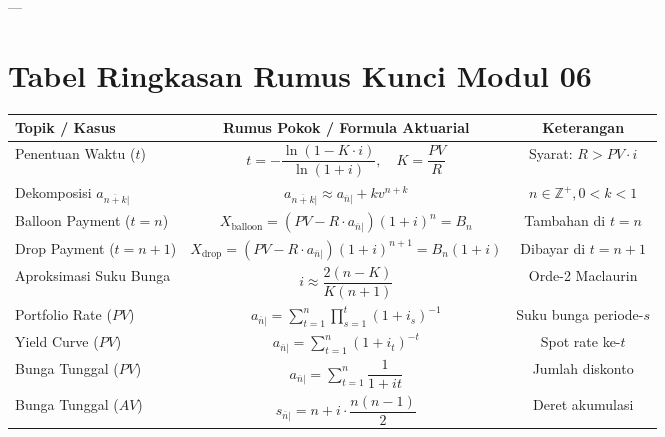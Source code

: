 \documentclass[11pt,a4paper]{article}
\begin{document}
---

\section{Tabel Ringkasan Rumus Kunci Modul 06}

\begin{center}
\small
\setlength{\tabcolsep}{3.5pt}
\renewcommand{\arraystretch}{1.25}
\begin{tabular}{p{3.8cm}cc}
\toprule
\textbf{Topik / Kasus} & \textbf{Rumus Pokok / Formula Aktuarial} & \textbf{Keterangan} \\
\midrule
Penentuan Waktu ($t$) & $t = -\dfrac{\ln(1 - K \cdot i)}{\ln(1+i)}, \quad K = \dfrac{PV}{R}$ & Syarat: $R > PV \cdot i$ \\[0.8em]
Dekomposisi $a_{\overline{n+k}|}$ & $a_{\overline{n+k}|} \approx a_{\overline{n}|} + k v^{n+k}$ & $n \in \mathbb{Z}^+, 0 < k < 1$ \\[0.8em]
Balloon Payment ($t=n$) & $X_{\text{balloon}} = (PV - R \cdot a_{\overline{n}|})(1+i)^n = B_n$ & Tambahan di $t=n$ \\[0.8em]
Drop Payment ($t=n+1$) & $X_{\text{drop}} = (PV - R \cdot a_{\overline{n}|})(1+i)^{n+1} = B_n (1+i)$ & Dibayar di $t=n+1$ \\[0.8em]
Aproksimasi Suku Bunga & $i \approx \dfrac{2(n - K)}{K(n + 1)}$ & Orde-2 Maclaurin \\[0.8em]
Portfolio Rate ($PV$) & $a_{\overline{n}|} = \sum_{t=1}^n \prod_{s=1}^t (1+i_s)^{-1}$ & Suku bunga periode-$s$ \\[0.8em]
Yield Curve ($PV$) & $a_{\overline{n}|} = \sum_{t=1}^n (1+i_t)^{-t}$ & Spot rate ke-$t$ \\[0.8em]
Bunga Tunggal ($PV$) & $a_{\overline{n}|} = \sum_{t=1}^n \dfrac{1}{1 + it}$ & Jumlah diskonto \\[0.8em]
Bunga Tunggal ($AV$) & $s_{\overline{n}|} = n + i \cdot \dfrac{n(n-1)}{2}$ & Deret akumulasi \\
\bottomrule
\end{tabular}
\end{center}
\end{document}
